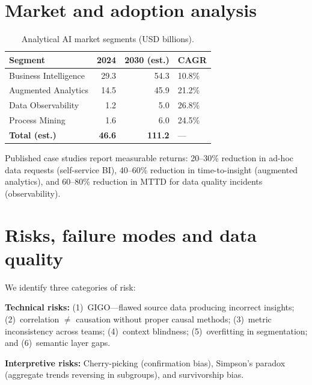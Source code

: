\documentclass[preprint,12pt,authoryear]{elsarticle}
\theoremstyle{definition}
\begin{document}
\section{Market and adoption analysis}\label{sec:market}

\begin{table}[ht]
\centering
\caption{Analytical AI market segments (USD billions).}
\label{tab:market}
\begin{tabular}{lrrl}
\toprule
\textbf{Segment} & \textbf{2024} & \textbf{2030 (est.)} & \textbf{CAGR} \\
\midrule
Business Intelligence       & 29.3 & 54.3  & 10.8\% \\
Augmented Analytics         & 14.5 & 45.9  & 21.2\% \\
Data Observability          & 1.2  & 5.0   & 26.8\% \\
Process Mining              & 1.6  & 6.0   & 24.5\% \\
\midrule
\textbf{Total (est.)}      & \textbf{46.6} & \textbf{111.2} & --- \\
\bottomrule
\end{tabular}
\end{table}

Published case studies report measurable returns: 20--30\% reduction in ad-hoc data requests (self-service BI), 40--60\% reduction in time-to-insight (augmented analytics), and 60--80\% reduction in MTTD for data quality incidents (observability).

\section{Risks, failure modes and data quality}\label{sec:risks}

We identify three categories of risk:

\textbf{Technical risks:} (1)~GIGO---flawed source data producing incorrect insights; (2)~correlation $\neq$ causation without proper causal methods; (3)~metric inconsistency across teams; (4)~context blindness; (5)~overfitting in segmentation; and (6)~semantic layer gaps.

\textbf{Interpretive risks:} Cherry-picking (confirmation bias), Simpson's paradox (aggregate trends reversing in subgroups), and survivorship bias.
\end{document}
